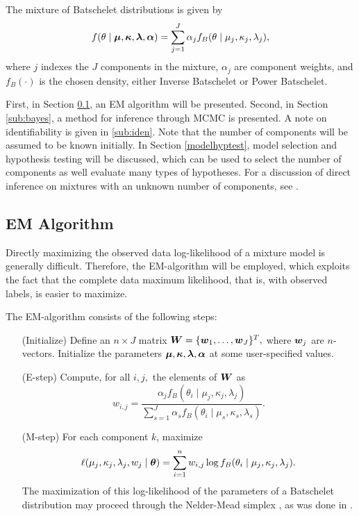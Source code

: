 The mixture of Batschelet distributions is given by
\begin{equation}
 f(\theta \mid \boldsymbol{\mu}, \boldsymbol{\kappa}, \boldsymbol{\lambda}, \boldsymbol{\alpha}) = \sum_{j = 1}^J\alpha_j f_B(\theta \mid \mu_j, \kappa_j, \lambda_j),
\end{equation}
where \(j\) indexes the \(J\) components in the mixture, $\alpha_j$ are component weights, and \(f_B(\cdot)\) is the chosen density, either Inverse Batschelet or Power Batschelet.


First, in Section \ref{sub:em}, an EM algorithm will be presented. Second, in Section \ref{sub:bayes}, a method for inference through MCMC is presented. A note on identifiability is given in \ref{sub:iden}. Note that the number of components will be assumed to be known initially. In Section \ref{modelhyptest}, model selection and hypothesis testing will be discussed, which can be used to select the number of components as well evaluate many types of hypotheses. For a discussion of direct inference on mixtures with an unknown number of components, see \citet{richardson1997bayesian}.

\subsection{EM Algorithm}
\label{sub:em}

Directly maximizing the observed data log-likelihood of a mixture model is generally difficult. Therefore, the EM-algorithm will be employed, which exploits the fact that the complete data maximum likelihood, that is, with observed labels, is easier to maximize.

The EM-algorithm consists of the following steps:

\begin{enumerate}
\item[(Initialize)] Define an \(n \times J\) matrix \(\boldsymbol{W} = \{\boldsymbol{w}_1, \dots, \boldsymbol{w}_J\}^T,\) where \(\boldsymbol{w}_j\) are \(n\)-vectors. Initialize the parameters \( \boldsymbol{\mu}, \boldsymbol{\kappa}, \boldsymbol{\lambda}, \boldsymbol{\alpha}\) at some user-specified values.
\item[(E-step)] Compute, for all \(i, j,\) the elements of \(\boldsymbol{W}\) as
\begin{equation}
w_{i, j} = \frac{\alpha_j f_B(\theta_i \mid \mu_j, \kappa_j, \lambda_j)}{\sum_{s = 1}^J \alpha_s f_B(\theta_i \mid \mu_s, \kappa_s, \lambda_s)}.
\end{equation}
\item[(M-step)] For each component \(k\), maximize
\begin{equation}
  \ell(\mu_j, \kappa_j, \lambda_j, w_j \mid \boldsymbol{\theta}) =\sum_{i=1}^n w_{i, j}  \log f_B(\theta_i \mid \mu_j, \kappa_j, \lambda_j).
\end{equation}
The maximization of this log-likelihood of the parameters of a Batschelet distribution may proceed through the Nelder-Mead simplex \citep{nelder1965simplex}, as was done in \citet{jones2012inverse}.
\end{enumerate}

